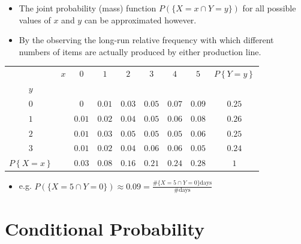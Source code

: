 \documentclass[notes=show,handout]{beamer}\usepackage[]{graphicx}\usepackage[]{color}
\renewcommand{\Pr}{P}
\begin{document}
\begin{frame}{\secname}


  \begin{example}
  \begin{footnotesize}

  \begin{itemize}
  \item The joint probability (mass) function $\Pr(\{X=x\cap Y=y\})$ for all
  possible values of $x$ and $y$ can be approximated however.

  \item By the observing the long-run relative frequency with which different
  numbers of items are actually produced by either production line.
  \end{itemize}

  \begin{tabular}{|cc||c|c|c|c|c|c||c|}
  \hline
  & $x$ & $0$ & $1$ & $2$ & $3$ & $4$ & $5$ & $\Pr \left\{ Y=y\right\} $ \\
  $y$ &  &  &  &  &  &  &  &  \\ \hline\hline
  $0$ &  & $0$ & $0.01$ & $0.03$ & $0.05$ & $0.07$ & $0.09$ & $0.25$ \\ \hline
  $1$ &  & $0.01$ & $0.02$ & $0.04$ & $0.05$ & $0.06$ & $0.08$ & $0.26$ \\
  \hline
  $2$ &  & $0.01$ & $0.03$ & $0.05$ & $0.05$ & $0.05$ & $0.06$ & $0.25$ \\
  \hline
  $3$ &  & $0.01$ & $0.02$ & $0.04$ & $0.06$ & $0.06$ & $0.05$ & $0.24$ \\
  \hline\hline
  $\Pr \left\{ X=x\right\} $ &  & $0.03$ & $0.08$ & $0.16$ & $0.21$ & $0.24$ &
  $0.28$ & $1$ \\ \hline
  \end{tabular}

  \begin{itemize}

  \item e.g. $\Pr(\{X=5\cap Y=0\})\approx 0.09=\frac{\#\{X=5\cap Y=0\}\text{days}%
  }{\#\text{days}}$
  \end{itemize}

  \end{footnotesize}
  \end{example}
\end{frame}

\section{Conditional Probability}
\end{document}
